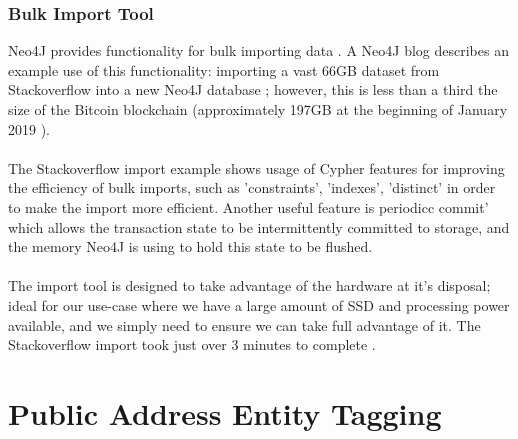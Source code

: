 \subsubsection{Bulk Import Tool}
Neo4J provides functionality for bulk importing data \cite{RefWorks:doc:5c6ab610e4b02c4a19ae3ed1}. A Neo4J blog describes an example use of this functionality: importing a  vast 66GB dataset from Stackoverflow into a new Neo4J database \cite{RefWorks:doc:5c6ab2bae4b08c9b85da964f}; however, this is less than a third the size of the Bitcoin blockchain (approximately 197GB at the beginning of January 2019 \cite{RefWorks:doc:5c6ab1a3e4b05e3aaec0ffc8}).
\\\\ 
The Stackoverflow import example shows usage of Cypher features for improving the efficiency of bulk imports, such as 'constraints', 'indexes', 'distinct'  in order to make the import more efficient. Another useful feature is periodicc commit' which allows the transaction state to be intermittently committed to storage, and the memory Neo4J is using to hold this state to be flushed. 
\\\\
The import tool is designed to take advantage of the hardware at it's disposal; ideal for our use-case where we have a large amount of SSD and processing power available, and we simply need to ensure we can take full advantage of it. The Stackoverflow import took just over 3 minutes to complete \cite{RefWorks:doc:5c6ab2bae4b08c9b85da964f}. 


\section{Public Address Entity Tagging}



